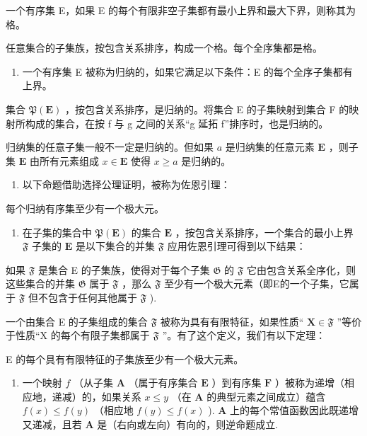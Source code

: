 一个有序集 E，如果 E 的每个有限非空子集都有最小上界和最大下界，则称其为格。

任意集合的子集族，按包含关系排序，构成一个格。每个全序集都是格。

\begin{enumerate}
\def\labelenumi{\arabic{enumi}.}
\setcounter{enumi}{8}
\tightlist
\item
  一个有序集 E 被称为归纳的，如果它满足以下条件：E 的每个全序子集都有上界。
\end{enumerate}

集合 \(\mathfrak{P}(\mathbf{E})\) ，按包含关系排序，是归纳的。将集合 E 的子集映射到集合 F 的映射所构成的集合，在按 f 与 g 之间的关系“g 延拓 f”排序时，也是归纳的。

归纳集的任意子集一般不一定是归纳的。但如果 \(a\) 是归纳集的任意元素 \(\mathbf{E}\) ，则子集 \(\mathbf{E}\) 由所有元素组成 \(x \in \mathbf{E}\) 使得 \(x \geqslant a\) 是归纳的。

\begin{enumerate}
\def\labelenumi{\arabic{enumi}.}
\setcounter{enumi}{9}
\tightlist
\item
  以下命题借助选择公理证明，被称为佐恩引理：
\end{enumerate}

每个归纳有序集至少有一个极大元。

\begin{enumerate}
\def\labelenumi{\arabic{enumi}.}
\setcounter{enumi}{10}
\tightlist
\item
  在子集的集合中 \(\mathfrak{P}(\mathbf{E})\) 的集合 \(\mathbf{E}\) ，按包含关系排序，一个集合的最小上界 \(\mathfrak{F}\) 子集的 \(\mathbf{E}\) 是以下集合的并集 \(\mathfrak{F}\) 应用佐恩引理可得到以下结果：
\end{enumerate}

如果 \(\mathfrak{F}\) 是集合 E 的子集族，使得对于每个子集 \(\mathfrak{G}\) 的 \(\mathfrak{F}\) 它由包含关系全序化，则这些集合的并集 \(\mathfrak{G}\) 属于 \(\mathfrak{F}\) ，那么 \(\mathfrak{F}\) 至少有一个极大元素（即E的一个子集，它属于 \(\mathfrak{F}\) 但不包含于任何其他属于 \(\mathfrak{F}\) ).

一个由集合 E 的子集组成的集合 \(\mathfrak{F}\) 被称为具有有限特征，如果性质“ \(\mathbf{X} \in \mathfrak{F}\) ”等价于性质“X 的每个有限子集都属于 \(\mathfrak{F}\) ”。有了这个定义，我们有以下定理：

E 的每个具有有限特征的子集族至少有一个极大元素。

\begin{enumerate}
\def\labelenumi{\arabic{enumi}.}
\setcounter{enumi}{11}
\tightlist
\item
  一个映射 \(f\) （从子集 \(\mathbf{A}\) （属于有序集合 \(\mathbf{E}\) ）到有序集 \(\mathbf{F}\) ）被称为递增（相应地，递减）的，如果关系 \(x \leqslant y\) （在 \(\mathbf{A}\) 的典型元素之间成立）蕴含 \(f(x) \leqslant f(y)\) （相应地 \(f(y) \leqslant f(x)\) ). \(\mathbf{A}\) 上的每个常值函数因此既递增又递减，且若 \(\mathbf{A}\) 是（右向或左向）有向的，则逆命题成立.
\end{enumerate}

